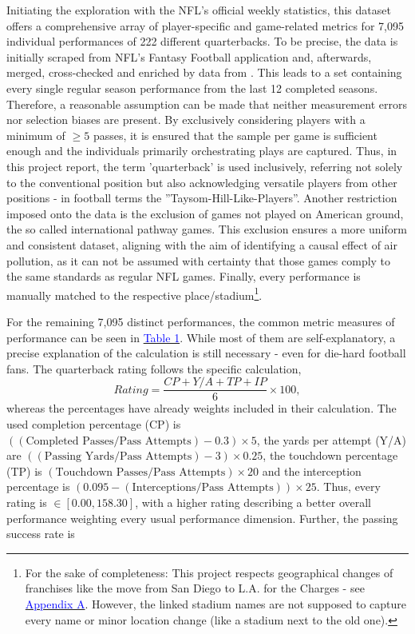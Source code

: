 \documentclass[12pt,a4paper]{article}
\newcommand{\mylink}[2]{\hyperref[#1]{\textcolor{blue}{#2}}}
\begin{document}
Initiating the exploration with the NFL's official weekly statistics, this dataset offers a comprehensive array of player-specific and game-related metrics for 7,095 individual performances of 222 different quarterbacks. To be precise, the data is initially scraped from NFL's Fantasy Football application and, afterwards, merged, cross-checked and enriched by data from \citeauthor{Stathead}. This leads to a set containing every single regular season performance from the last 12 completed seasons. Therefore, a reasonable assumption can be made that neither measurement errors nor selection biases are present. By exclusively considering players with a minimum of $\geq 5$ passes, it is ensured that the sample per game is sufficient enough and the individuals primarily orchestrating plays are captured. Thus, in this project report, the term 'quarterback' is used inclusively, referring not solely to the conventional position but also acknowledging versatile players from other positions - in football terms the ''Taysom-Hill-Like-Players''. Another restriction imposed onto the data is the exclusion of games not played on American ground, the so called  international pathway games. This exclusion ensures a more uniform and consistent dataset, aligning with the aim of identifying a causal effect of air pollution, as it can not be assumed with certainty that those games comply to the same standards as regular NFL games. Finally, every performance is manually matched to the respective place/stadium\footnote{For the sake of completeness: This project respects geographical changes of franchises like the move from San Diego to L.A. for the Charges - see \mylink{AppF:1}{Appendix A}. However, the linked stadium names are not supposed to capture every name or minor location change (like a stadium next to the old one).}. 

For the remaining 7,095 distinct performances, the common metric measures of performance can be seen in \mylink{tab:1}{Table 1}. While most of them are self-explanatory, a precise explanation of the calculation is still necessary - even for die-hard football fans. The quarterback rating follows the specific calculation, 
\begin{equation}
Rating = \dfrac{CP + Y/A + TP + IP}{6} \times 100,
\end{equation}
whereas the percentages have already weights included in their calculation. The used completion percentage (CP) is $ ((\textrm{Completed Passes} / \textrm{Pass Attempts}) - 0.3) \times 5$, the yards per attempt (Y/A) are $((\textrm{Passing Yards} / \textrm{Pass Attempts}) - 3) \times 0.25$, the touchdown percentage (TP) is $(\textrm{Touchdown Passes} / \textrm{Pass Attempts}) \times 20$ and the interception percentage is  $(0.095 - (\textrm{Interceptions} / \textrm{Pass Attempts})) \times 25$. Thus, every rating is $ \in [ 0.00 ,158.30 ]$, with a higher rating describing a better overall performance weighting every usual performance dimension. Further, the passing success rate is 
\end{document}
